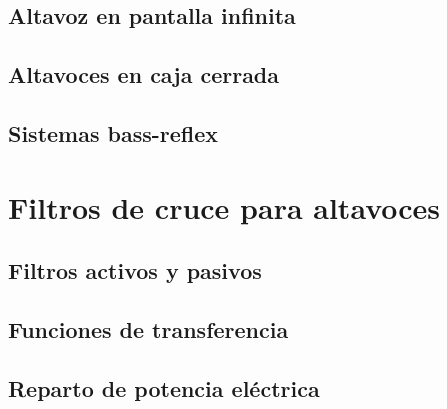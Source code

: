 \documentclass[10pt]{book}
\begin{document}









\section{Altavoz en pantalla infinita}
\section{Altavoces en caja cerrada}
\section{Sistemas bass-reflex}


\chapter{Filtros de cruce para altavoces}
\section{Filtros activos y pasivos}
\section{Funciones de transferencia}
\section{Reparto de potencia eléctrica}
\end{document}
